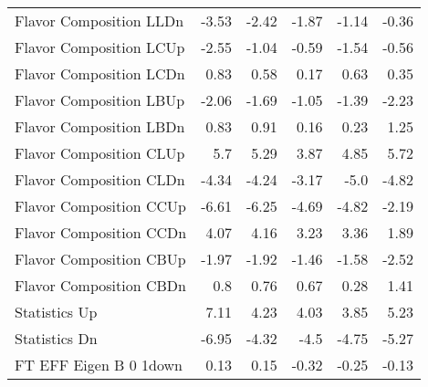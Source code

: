 \begin{table}[htbp]
{\begin{tabular}{lrrrrr}
Flavor Composition LLDn                               & -3.53            & -2.42              & -1.87              & -1.14              & -0.36              \\
Flavor Composition LCUp                               & -2.55            & -1.04              & -0.59              & -1.54              & -0.56              \\
Flavor Composition LCDn                               & 0.83             & 0.58               & 0.17               & 0.63               & 0.35               \\
Flavor Composition LBUp                               & -2.06            & -1.69              & -1.05              & -1.39              & -2.23              \\
Flavor Composition LBDn                               & 0.83             & 0.91               & 0.16               & 0.23               & 1.25               \\
Flavor Composition CLUp                               & 5.7              & 5.29               & 3.87               & 4.85               & 5.72               \\
Flavor Composition CLDn                               & -4.34            & -4.24              & -3.17              & -5.0               & -4.82              \\
Flavor Composition CCUp                               & -6.61            & -6.25              & -4.69              & -4.82              & -2.19              \\
Flavor Composition CCDn                               & 4.07             & 4.16               & 3.23               & 3.36               & 1.89               \\
Flavor Composition CBUp                               & -1.97            & -1.92              & -1.46              & -1.58              & -2.52              \\
Flavor Composition CBDn                               & 0.8              & 0.76               & 0.67               & 0.28               & 1.41               \\
Statistics Up                             & 7.11             & 4.23               & 4.03               & 3.85               & 5.23               \\
Statistics Dn                             & -6.95            & -4.32              & -4.5               & -4.75              & -5.27              \\
FT EFF Eigen B 0  1down      & 0.13             & 0.15               & -0.32              & -0.25              & -0.13              \\

\end{tabular}}
\end{table}
